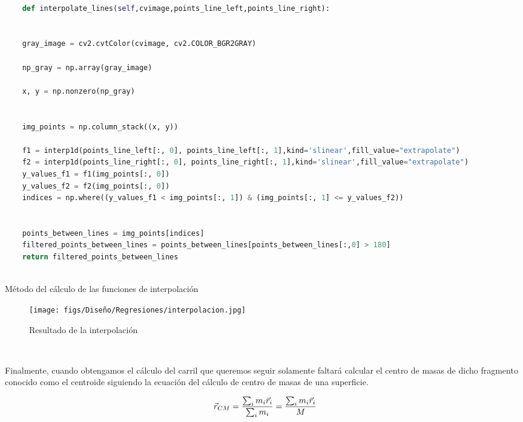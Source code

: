 \begin{code}[h]
  \begin{lstlisting}[language=Python]

    def interpolate_lines(self,cvimage,points_line_left,points_line_right):


    gray_image = cv2.cvtColor(cvimage, cv2.COLOR_BGR2GRAY) 

    np_gray = np.array(gray_image)

    x, y = np.nonzero(np_gray)


    img_points = np.column_stack((x, y))

    f1 = interp1d(points_line_left[:, 0], points_line_left[:, 1],kind='slinear',fill_value="extrapolate")
    f2 = interp1d(points_line_right[:, 0], points_line_right[:, 1],kind='slinear',fill_value="extrapolate") 
    y_values_f1 = f1(img_points[:, 0])
    y_values_f2 = f2(img_points[:, 0])
    indices = np.where((y_values_f1 < img_points[:, 1]) & (img_points[:, 1] <= y_values_f2))
    
    
    points_between_lines = img_points[indices]
    filtered_points_between_lines = points_between_lines[points_between_lines[:,0] > 180]
    return filtered_points_between_lines
    

  \end{lstlisting}
  \caption[Método de interpolación]{Método del cálculo de las funciones de interpolación}
  \label{cod:codejemplo}
  \end{code}  

  \begin{figure} [H]
    \begin{center}
      \texttt{[image: figs/Diseño/Regresiones/interpolacion.jpg]}
    \end{center}
    \caption{Resultado de la interpolación}
    \label{fig:interpolación}
  \end{figure}\

  Finalmente, cuando obtengamos el cálculo del carril que queremos seguir solamente faltará calcular el centro de masas de dicho fragmento conocido como el centroide siguiendo la ecuación
  del cálculo de centro de masas de una superficie. \newline

  \begin{equation} 
    \vec{r}_{CM} = \frac{\sum_{i}m_{i} \vec{r}_{i}}{\sum_{i}m_{i}} = \frac{\sum_{i}m_{i} \vec{r}_{i}}{M} 
    \newline
  \end{equation} 
 
